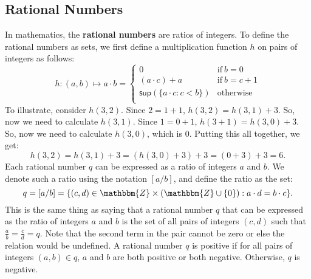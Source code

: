 \documentclass[11pt]{article}
\theoremstyle{definition}
\theoremstyle{remark}
\begin{document}
\subsection{Rational Numbers}
In mathematics, the \textbf{rational numbers} are ratios of integers. To define the rational numbers as sets, we first define a multiplication function $h$ on pairs of integers as follows:
\begin{equation}
    h:(a,b)\mapsto a\cdot b = \begin{cases}
        0 & \text{if} \ b=0\\
        (a\cdot c) + a & \text{if} \ b=c+1\\
        \textsf{sup}(\{a\cdot c:c<b\}) & \text{otherwise}\\
    \end{cases}
\end{equation}
To illustrate, consider $h(3,2)$. Since $2=1+1$, $h(3,2)=h(3,1)+3$. So, now we need to calculate $h(3,1)$. Since $1=0+1$, $h(3+1)=h(3,0)+3$. So, now we need to calculate $h(3,0)$, which is $0$. Putting this all together, we get:
$$h(3,2)=h(3,1)+3=(h(3,0)+3)+3=(0+3)+3=6.$$
Each rational number $q$ can be expressed as a ratio of integers $a$ and $b$. We denote such a ratio using the notation $[a/b]$, and define the ratio as the set:
$$q = [a/b] = \{(c,d)\in\mathbbm{Z}\times(\mathbbm{Z}\cup\{0\}):a\cdot d= b\cdot c\}.$$
This is the same thing as saying that a rational number $q$ that can be expressed as the ratio of integers $a$ and $b$ is the set of all pairs of integers $(c,d)$ such that $\frac{a}{b}=\frac{c}{d} = q$. Note that the second term in the pair cannot be zero or else the relation would be undefined. A rational number $q$ is positive if for all pairs of integers $(a,b)\in q$, $a$ and $b$ are both positive or both negative. Otherwise, $q$ is negative.
\end{document}
